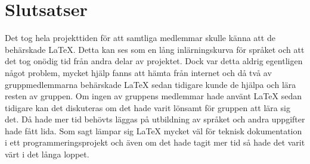 \section{Slutsatser}
Det tog hela projekttiden för att samtliga medlemmar skulle känna att de behärskade {\LaTeX}. Detta kan ses som en lång inlärningskurva för språket och att det tog onödig tid från andra delar av projektet. Dock var detta aldrig egentligen något problem, mycket hjälp fanns att hämta från internet och då två av gruppmedlemmarna behärskade {\LaTeX} sedan tidigare kunde de hjälpa och lära resten av gruppen. 
\newline
\newline
Om ingen av gruppens medlemmar hade använt {\LaTeX} sedan tidigare kan det diskuteras om det hade varit lönsamt för gruppen att lära sig det. Då hade mer tid behövts läggas på utbildning av språket och andra uppgifter hade fått lida. Som sagt lämpar sig {\LaTeX} mycket väl för teknisk dokumentation i ett programmeringsprojekt och även om det hade tagit mer tid så hade det varit värt i det långa loppet.    